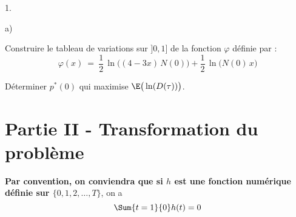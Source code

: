 \documentclass[11pt]{article}%
\begin{document}
\begin{noliste}{1.}
\begin{noliste}{a)}
    
    \item Construire le tableau de variations sur $]0,1]$ de la 
    fonction $\varphi$ définie par :
    \[
      \varphi(x) \ = \ \dfrac{1}{2} \, \ln\big((4-3x) \, N(0)\big) 
      + \dfrac{1}{2} \, \ln\big(N(0) \, x\big)
    \]
    
    
    
    

    
    \item Déterminer $p^*(0)$ qui maximise $\E\big(\ln(D(\tau))\big)$.
    
    
  \end{noliste}
\end{noliste}




\section*{Partie II - Transformation du problème}

\noindent
{\bf Par convention, on conviendra que si $h$ est une fonction 
numérique définie sur $\{0,1,2, \ldots, T\}$}, on a
\[
  \Sum{t=1}{0} h(t)=0
\]
\end{document}
